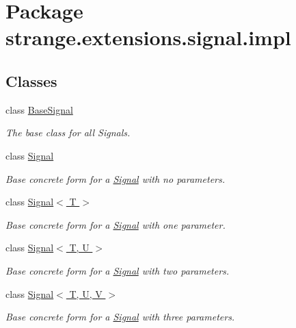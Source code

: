 \hypertarget{namespacestrange_1_1extensions_1_1signal_1_1impl}{\section{Package strange.\-extensions.\-signal.\-impl}
\label{namespacestrange_1_1extensions_1_1signal_1_1impl}
}
\subsection*{Classes}
\begin{DoxyCompactItemize}
\item 
class \hyperlink{classstrange_1_1extensions_1_1signal_1_1impl_1_1_base_signal}{Base\-Signal}
\begin{DoxyCompactList}\small\item\em The base class for all Signals. \end{DoxyCompactList}\item 
class \hyperlink{classstrange_1_1extensions_1_1signal_1_1impl_1_1_signal}{Signal}
\begin{DoxyCompactList}\small\item\em Base concrete form for a \hyperlink{classstrange_1_1extensions_1_1signal_1_1impl_1_1_signal}{Signal} with no parameters. \end{DoxyCompactList}\item 
class \hyperlink{classstrange_1_1extensions_1_1signal_1_1impl_1_1_signal_3_01_t_01_4}{Signal$<$ T $>$}
\begin{DoxyCompactList}\small\item\em Base concrete form for a \hyperlink{classstrange_1_1extensions_1_1signal_1_1impl_1_1_signal}{Signal} with one parameter. \end{DoxyCompactList}\item 
class \hyperlink{classstrange_1_1extensions_1_1signal_1_1impl_1_1_signal_3_01_t_00_01_u_01_4}{Signal$<$ T, U $>$}
\begin{DoxyCompactList}\small\item\em Base concrete form for a \hyperlink{classstrange_1_1extensions_1_1signal_1_1impl_1_1_signal}{Signal} with two parameters. \end{DoxyCompactList}\item 
class \hyperlink{classstrange_1_1extensions_1_1signal_1_1impl_1_1_signal_3_01_t_00_01_u_00_01_v_01_4}{Signal$<$ T, U, V $>$}
\begin{DoxyCompactList}\small\item\em Base concrete form for a \hyperlink{classstrange_1_1extensions_1_1signal_1_1impl_1_1_signal}{Signal} with three parameters. \end{DoxyCompactList}\item 

\end{DoxyCompactItemize}
